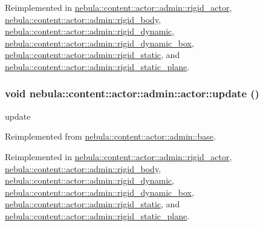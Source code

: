 Reimplemented in \hyperlink{classnebula_1_1content_1_1actor_1_1admin_1_1rigid__actor_aba5200b2e542e3f0433c89ef026c5673}{nebula::content::actor::admin::rigid\_\-actor}, \hyperlink{classnebula_1_1content_1_1actor_1_1admin_1_1rigid__body_a91d4e1a3e78ee41a5ddea1974a88045d}{nebula::content::actor::admin::rigid\_\-body}, \hyperlink{classnebula_1_1content_1_1actor_1_1admin_1_1rigid__dynamic_ae5350e2820c0e00c36c663fc63a8b83c}{nebula::content::actor::admin::rigid\_\-dynamic}, \hyperlink{classnebula_1_1content_1_1actor_1_1admin_1_1rigid__dynamic__box_a2989dba143de5dabded9ca32702cccaa}{nebula::content::actor::admin::rigid\_\-dynamic\_\-box}, \hyperlink{classnebula_1_1content_1_1actor_1_1admin_1_1rigid__static_a6f209af8d75aa5159b4a2d75fcf2701a}{nebula::content::actor::admin::rigid\_\-static}, and \hyperlink{classnebula_1_1content_1_1actor_1_1admin_1_1rigid__static__plane_af1c2da35d02592bf5cad8823775bb2d7}{nebula::content::actor::admin::rigid\_\-static\_\-plane}.\hypertarget{classnebula_1_1content_1_1actor_1_1admin_1_1actor_a9290e8e1981731fe362d3995cf010514}{
\subsubsection[{update}]{\setlength{\rightskip}{0pt plus 5cm}void nebula::content::actor::admin::actor::update ()}}
\label{classnebula_1_1content_1_1actor_1_1admin_1_1actor_a9290e8e1981731fe362d3995cf010514}


update 

Reimplemented from \hyperlink{classnebula_1_1content_1_1actor_1_1admin_1_1base_a1401d047ad4b2459a047644da275cebf}{nebula::content::actor::admin::base}.

Reimplemented in \hyperlink{classnebula_1_1content_1_1actor_1_1admin_1_1rigid__actor_a3c0adb150e7bfb43c209e6dc102253a5}{nebula::content::actor::admin::rigid\_\-actor}, \hyperlink{classnebula_1_1content_1_1actor_1_1admin_1_1rigid__body_aacabe8d617dd48c2ffec43edae75553d}{nebula::content::actor::admin::rigid\_\-body}, \hyperlink{classnebula_1_1content_1_1actor_1_1admin_1_1rigid__dynamic_a2bf9e18773b7db87cb35fef56274405a}{nebula::content::actor::admin::rigid\_\-dynamic}, \hyperlink{classnebula_1_1content_1_1actor_1_1admin_1_1rigid__dynamic__box_ad0c1ca664351042f80ede5ed0a5bba0a}{nebula::content::actor::admin::rigid\_\-dynamic\_\-box}, \hyperlink{classnebula_1_1content_1_1actor_1_1admin_1_1rigid__static_af7ecdabc256260e8ae07436b3bc4854f}{nebula::content::actor::admin::rigid\_\-static}, and \hyperlink{classnebula_1_1content_1_1actor_1_1admin_1_1rigid__static__plane_ad14b9160b7c1aa9ae29d52141d1b6221}{nebula::content::actor::admin::rigid\_\-static\_\-plane}.


